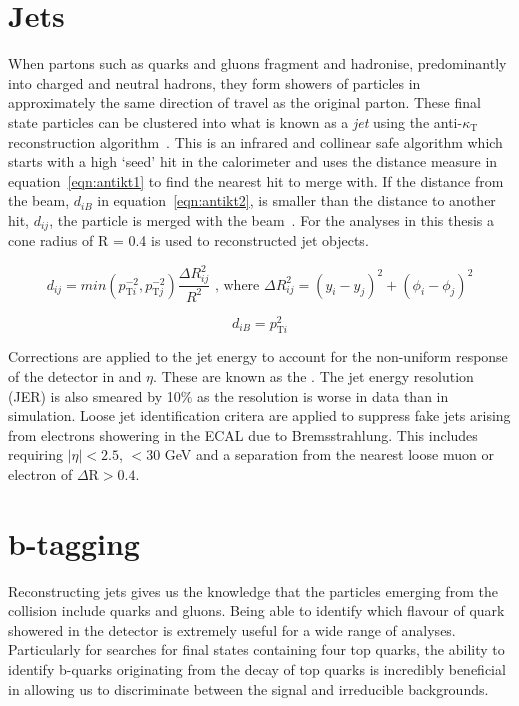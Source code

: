 \section{Jets \label{sec:jetreco}}
When partons such as quarks and gluons fragment and hadronise, predominantly into charged and neutral hadrons, they form showers of particles in approximately the same direction of travel as the original parton. These final state particles can be clustered into what is known as a \emph{jet} using the anti-$\kappa_{\textrm{T}}$ reconstruction algorithm~\cite{Cacciari:2008gp}. This is an infrared and collinear safe algorithm which starts with a high \pt `seed' hit in the calorimeter and uses the distance measure in equation~\ref{eqn:antikt1} to find the nearest hit to merge with. If the distance from the beam, $d_{iB}$ in equation~\ref{eqn:antikt2}, is smaller than the distance to another hit, $d_{ij}$, the particle is merged with the beam~\cite{Salam2010}.  For the analyses in this thesis a cone radius of R = 0.4 is used to reconstructed jet objects. 


\begin{equation}
d_{ij}=min\left( p_{\textrm{T}i}^{-2},p_{\textrm{T}j}^{-2} \right) \frac{\Delta R_{ij}^{2}}{R^{2}} \textrm{ , where } \Delta R_{ij}^{2} = {\left( y_{i} - y_{j}\right)}^{2} +  {\left( {\phi}_{i} - {\phi}_{j}\right)}^{2}
\label{eqn:antikt1}
\end{equation}

\begin{equation}
d_{iB}=p_{\textrm{T}i}^{2}
\label{eqn:antikt2}
\end{equation}

Corrections are applied to the jet energy to account for the non-uniform response of the detector in \pt and $\eta$. These are known as the . The jet energy resolution (JER) is also smeared by 10$\%$ as the resolution is worse in data than in simulation. Loose jet identification critera are applied to suppress fake jets arising from electrons showering in the ECAL due to Bremsstrahlung. This includes requiring $|\eta|<2.5$, \pt$<30$ GeV and a separation from the nearest loose muon or electron of $\Delta\textrm{R}>0.4$.

\section{b-tagging ~\label{sec:btagreco}}
Reconstructing jets gives us the knowledge that the particles emerging from the collision include quarks and gluons. Being able to identify which flavour of quark showered in the detector is extremely useful for a wide range of analyses. Particularly for searches for final states containing four top quarks, the ability to identify b-quarks originating from the decay of top quarks is incredibly beneficial in allowing us to discriminate between the signal and irreducible backgrounds. 

